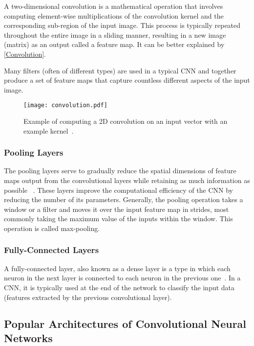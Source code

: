 A two-dimensional convolution is a mathematical operation that involves
computing element-wise multiplications of the convolution kernel and the
corresponding sub-region of the input image. This process is typically repeated
throughout the entire image in a sliding manner, resulting in a new image
(matrix) as an output called a feature map. It can be better explained by
\autoref{Convolution}.

Many filters (often of different types) are used in a typical CNN and together
produce a set of feature maps that capture countless different aspects of the
input image.

\begin{figure}[h]
    \centering
    \texttt{[image: convolution.pdf]}
    \caption{Example of computing a 2D convolution on an input vector with an example kernel~\cite{OShea2015}.}
    \label{Convolution}
\end{figure}


\subsubsection{Pooling Layers}

The pooling layers serve to gradually reduce the spatial dimensions of feature
maps output from the convolutional layers while retaining as much information as
possible ~\cite{OShea2015}. These layers improve the computational efficiency of
the CNN by reducing the number of its parameters. Generally, the pooling
operation takes a window or a filter and moves it over the input feature map in
strides, most commonly taking the maximum value of the inputs within the window.
This operation is called max-pooling.


\subsubsection{Fully-Connected Layers}

A fully-connected layer, also known as a dense layer is a type in which each
neuron in the next layer is connected to each neuron in the previous
one~\cite{OShea2015}. In a CNN, it is typically used at the end of the network
to classify the input data (features extracted by the previous convolutional
layer).


\subsection{Popular Architectures of Convolutional Neural Networks}


